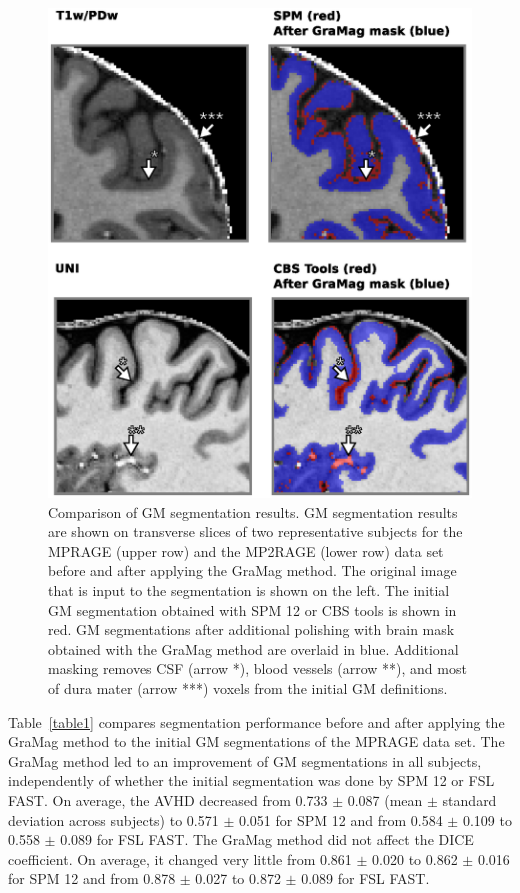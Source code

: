 \begin{figure}[htb!]
\centering
\includegraphics[width=\textwidth]{figures/chapter_02/figure_4.eps}
\caption{Comparison of GM segmentation results. GM segmentation results are shown on transverse slices of two representative subjects for the MPRAGE (upper row) and the MP2RAGE (lower row) data set before and after applying the GraMag method. The original image that is input to the segmentation is shown on the left. The initial GM segmentation obtained with SPM 12 or CBS tools is shown in red. GM segmentations after additional polishing with brain mask obtained with the GraMag method are overlaid in blue. Additional masking removes CSF (arrow *), blood vessels (arrow **), and most of dura mater (arrow ***) voxels from the initial GM definitions.}
\label{Fig4}
\end{figure}


Table~\ref{table1} compares segmentation performance before and after applying the GraMag method to the initial GM segmentations of the MPRAGE data set. The GraMag method led to an improvement of GM segmentations in all subjects, independently of whether the initial segmentation was done by SPM 12 or FSL FAST. On average, the AVHD decreased from 0.733 $\pm$ 0.087 (mean $\pm$ standard deviation across subjects) to 0.571 $\pm$ 0.051 for SPM 12 and from 0.584 $\pm$ 0.109 to 0.558 $\pm$ 0.089 for FSL FAST. The GraMag method did not affect the DICE coefficient. On average, it changed very little from 0.861 $\pm$ 0.020 to 0.862 $\pm$ 0.016 for SPM 12 and from 0.878 $\pm$ 0.027 to 0.872 $\pm$ 0.089 for FSL FAST.

